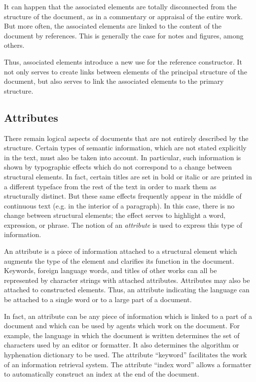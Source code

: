 It can happen that the associated elements are totally disconnected
from the structure of the document, as in a commentary or appraisal of
the entire work.  But more often, the associated elements are linked
to the content of the document by references.  This is generally the
case for notes and figures, among others.

Thus, associated elements introduce a new use for the reference
constructor.  It not only serves to create links between elements of
the principal structure of the document, but also serves to link the
associated elements to the primary structure.

\subsection{Attributes}
\label{attributes}

There remain logical aspects of documents that are not entirely
described by the structure.  Certain types of semantic information,
which are not stated explicitly in the text, must also be taken into
account.  In particular, such information is shown by typographic
effects which do not correspond to a change between structural
elements.  In fact, certain titles are set in bold or italic or are
printed in a different typeface from the rest of the text in order to
mark them as structurally distinct.  But these same effects frequently
appear in the middle of continuous text (e.g. in the interior of a
paragraph).  In this case, there is no change between structural
elements; the effect serves to highlight a word, expression, or
phrase.  The notion of an {\em attribute} is used to express this type
of information.

An attribute is a piece of information attached to a structural
element which augments the type of the element and clarifies its
function in the document.  Keywords, foreign language words, and
titles of other works can all be represented by character strings with
attached attributes.  Attributes may also be attached to constructed
elements.  Thus, an attribute indicating the language can be attached
to a single word or to a large part of a document.

In fact, an attribute can be any piece of information which is linked
to a part of a document and which can be used by agents which work on
the document.  For example, the language in which the document is
written determines the set of characters used by an editor or
formatter.  It also determines the algorithm or hyphenation dictionary
to be used.  The attribute ``keyword'' facilitates the work of an
information retrieval system.  The attribute ``index word'' allows a formatter
to automatically construct an index at the end of the document.

